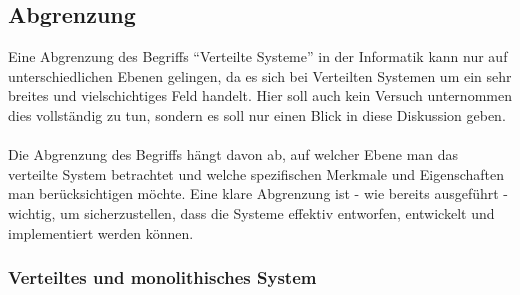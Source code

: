 \documentclass[../vs-script-first-v01.tex]{subfiles}
\begin{document}
\subsection{Abgrenzung}
Eine Abgrenzung des Begriffs \enquote{Verteilte Systeme} in der Informatik kann nur auf unterschiedlichen Ebenen gelingen, da es sich bei Verteilten Systemen um ein sehr breites und vielschichtiges Feld handelt. Hier soll auch kein Versuch unternommen dies vollständig zu tun, sondern es soll nur einen Blick in diese Diskussion geben. 
\\\\
Die Abgrenzung des Begriffs hängt davon ab, auf welcher Ebene man das verteilte System betrachtet und welche spezifischen Merkmale und Eigenschaften man berücksichtigen möchte. Eine klare Abgrenzung ist - wie bereits ausgeführt - wichtig, um sicherzustellen, dass die Systeme effektiv entworfen, entwickelt und implementiert werden können.

\subsubsection{Verteiltes und monolithisches System}
\end{document}
